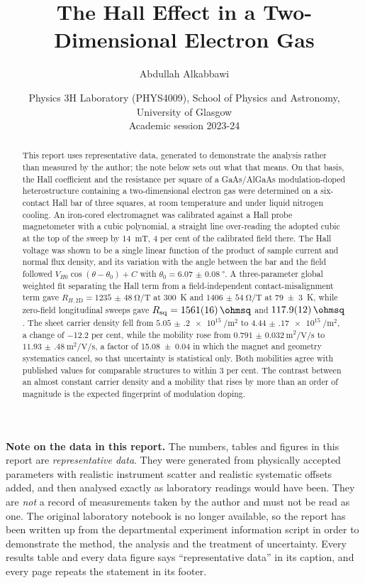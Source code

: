 \documentclass[11pt,a4paper]{article}
\title{\vspace{-1.2cm}\textbf{The Hall Effect in a Two-Dimensional Electron Gas}}
\author{Abdullah Alkabbawi}
\date{Physics 3H Laboratory (PHYS4009), School of Physics and Astronomy,\\
University of Glasgow\\[3pt]
Academic session 2023-24}
\newcommand{\Rsq}{R_{\mathrm{sq}}}
\newcommand{\Rhtwod}{R_{H,\mathrm{2D}}}
\begin{document}
\maketitle
\thispagestyle{plain}
\vspace{-0.4cm}

\begin{abstract}
\noindent
This report uses representative data, generated to demonstrate the analysis rather than
measured by the author; the note below sets out what that means. On that basis, the Hall
coefficient and the resistance per square of a GaAs/AlGaAs modulation-doped
heterostructure containing a two-dimensional electron gas were determined on a six-contact
Hall bar of three squares, at room temperature and under liquid nitrogen cooling. An
iron-cored electromagnet was calibrated against a Hall probe magnetometer with a cubic
polynomial, a straight line over-reading the adopted cubic at the top of the sweep by
\qty{14}{\milli\tesla}, \num{4} per cent of the calibrated field there. The Hall voltage was
shown to be a single linear function of the product of sample current and normal flux
density, and its variation with the angle between the bar and the field followed
$V_{H0}\cos(\theta-\theta_0)+C$ with $\theta_0 = \qty{6.07(8)}{\degree}$. A three-parameter
global weighted fit separating the Hall term from a field-independent
contact-misalignment term gave $\Rhtwod = \qty{1235(48)}{\ohm\per\tesla}$ at
\qty{300}{\kelvin} and $\qty{1406(54)}{\ohm\per\tesla}$ at \qty{79(3)}{\kelvin}, while
zero-field longitudinal sweeps gave $\Rsq = \qty{1561(16)}{\ohmsq}$ and
$\qty{117.9(12)}{\ohmsq}$. The sheet carrier density fell from
$\qty{5.05(20)e15}{\per\metre\squared}$ to $\qty{4.44(17)e15}{\per\metre\squared}$, a change
of \num{-12.2} per cent, while the mobility rose from
$\qty{0.791(32)}{\metre\squared\per\volt\per\second}$ to
$\qty{11.93(48)}{\metre\squared\per\volt\per\second}$, a factor of \num{15.08(4)} in which
the magnet and geometry systematics cancel, so that uncertainty is statistical only. Both
mobilities agree with published values for comparable structures to within \num{3} per cent.
The contrast between an almost constant carrier density and a mobility that rises by more
than an order of magnitude is the expected fingerprint of modulation doping.
\end{abstract}

\begin{notebox}
\noindent\textbf{Note on the data in this report.}
The numbers, tables and figures in this report are \emph{representative data}. They were
generated from physically accepted parameters with realistic instrument scatter and
realistic systematic offsets added, and then analysed exactly as laboratory readings would
have been. They are \emph{not} a record of measurements taken by the author and must not be
read as one. The original laboratory notebook is no longer available, so the report has been
written up from the departmental experiment information script in order to demonstrate the
method, the analysis and the treatment of uncertainty. Every results table and every data
figure says ``representative data'' in its caption, and every page repeats the statement in
its footer.
\end{notebox}
\end{document}
